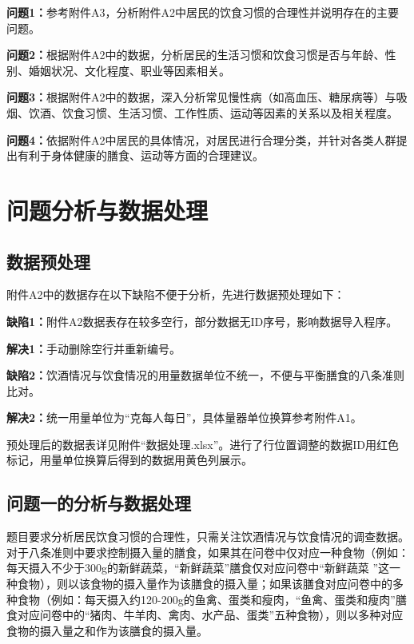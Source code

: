 \documentclass{article}
\numberwithin{equation}{subsection}
\begin{document}
\textbf{问题1：}参考附件A3，分析附件A2中居民的饮食习惯的合理性并说明存在的主要问题。

\textbf{问题2：}根据附件A2中的数据，分析居民的生活习惯和饮食习惯是否与年龄、性别、婚姻状况、文化程度、职业等因素相关。

\textbf{问题3：}根据附件A2中的数据，深入分析常见慢性病（如高血压、糖尿病等）与吸烟、饮酒、饮食习惯、生活习惯、工作性质、运动等因素的关系以及相关程度。

\textbf{问题4：}依据附件A2中居民的具体情况，对居民进行合理分类，并针对各类人群提出有利于身体健康的膳食、运动等方面的合理建议。
\vskip 0.5cm
{\centering\section{问题分析与数据处理}}

\subsection{数据预处理}
附件A2中的数据存在以下缺陷不便于分析，先进行数据预处理如下：

\textbf{缺陷1：}附件A2数据表存在较多空行，部分数据无ID序号，影响数据导入程序。

\textbf{解决1：}手动删除空行并重新编号。

\textbf{缺陷2：}饮酒情况与饮食情况的用量数据单位不统一，不便与平衡膳食的八条准则比对。

\textbf{解决2：}统一用量单位为“克每人每日”，具体量器单位换算参考附件A1。

预处理后的数据表详见附件“数据处理.xlsx”。进行了行位置调整的数据ID用红色标记，用量单位换算后得到的数据用黄色列展示。
\subsection{问题一的分析与数据处理}

题目要求分析居民饮食习惯的合理性，只需关注饮酒情况与饮食情况的调查数据。对于八条准则中要求控制摄入量的膳食，如果其在问卷中仅对应一种食物（例如：每天摄入不少于300g的新鲜蔬菜，“新鲜蔬菜”膳食仅对应问卷中“新鲜蔬菜 ”这一种食物），则以该食物的摄入量作为该膳食的摄入量；如果该膳食对应问卷中的多种食物（例如：每天摄入约120-200g的鱼禽、蛋类和瘦肉，“鱼禽、蛋类和瘦肉”膳食对应问卷中的“猪肉、牛羊肉、禽肉、水产品、蛋类”五种食物），则以多种对应食物的摄入量之和作为该膳食的摄入量。
\end{document}
